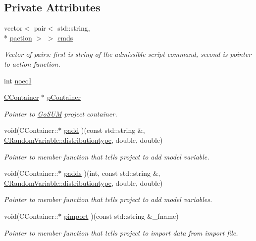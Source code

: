 \subsection*{Private Attributes}
\begin{DoxyCompactItemize}
\item 
vector$<$ pair$<$ std\-::string, \\*
\hyperlink{struct_go_s_u_m_a66b78848987ba5d005b4e86b8a1aef37}{paction} $>$ $>$ \hyperlink{class_go_s_u_m_1_1_c_script_a8dc1a600d5d66301d94f19ed3f49030c}{cmds}
\begin{DoxyCompactList}\small\item\em Vector of pairs\-: first is string of the admissible script command, second is pointer to action function. \end{DoxyCompactList}\item 
int \hyperlink{class_go_s_u_m_1_1_c_script_a6e87e334e47c180f9156bd158125e10c}{noeq\-I}
\item 
\hyperlink{class_go_s_u_m_1_1_c_container}{C\-Container} $\ast$ \hyperlink{class_go_s_u_m_1_1_c_script_a0434cbf97af11bf18d4d9c61bb10abc5}{p\-Container}
\begin{DoxyCompactList}\small\item\em Pointer to \hyperlink{struct_go_s_u_m}{Go\-S\-U\-M} project container. \end{DoxyCompactList}\item 
void(C\-Container\-::$\ast$ \hyperlink{class_go_s_u_m_1_1_c_script_ade2f8577d8eb25ddf804f29d250b0d9b}{padd} )(const std\-::string \&, \hyperlink{class_c_random_variable_a80d2a87c43847274138b51f7d713d7f1}{C\-Random\-Variable\-::distributiontype}, double, double)
\begin{DoxyCompactList}\small\item\em Pointer to member function that tells project to add model variable. \end{DoxyCompactList}\item 
void(C\-Container\-::$\ast$ \hyperlink{class_go_s_u_m_1_1_c_script_ac74b46284f8f3bb0840c08d8c4c5599f}{padds} )(int, const std\-::string \&, \hyperlink{class_c_random_variable_a80d2a87c43847274138b51f7d713d7f1}{C\-Random\-Variable\-::distributiontype}, double, double)
\begin{DoxyCompactList}\small\item\em Pointer to member function that tells project to add model variables. \end{DoxyCompactList}\item 
void(C\-Container\-::$\ast$ \hyperlink{class_go_s_u_m_1_1_c_script_a9c054f68ecb632cd954e7330bd59cda6}{pimport} )(const std\-::string \&\-\_\-fname)
\begin{DoxyCompactList}\small\item\em Pointer to member function that tells project to import data from import file. \end{DoxyCompactList}\end{DoxyCompactItemize}


